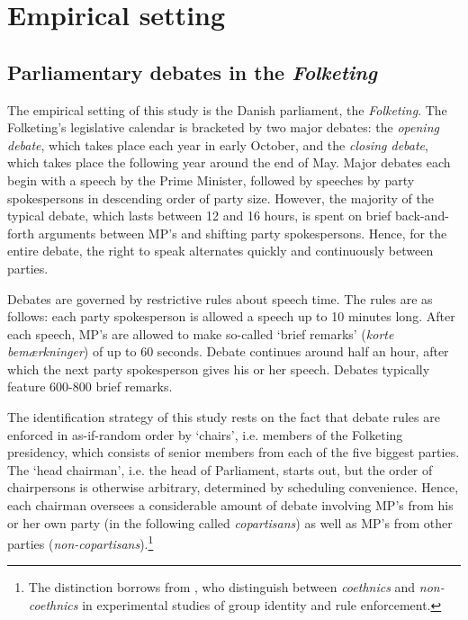 \documentclass[12pt,a4paper]{article}
\begin{document}
\section{Empirical setting}\label{emp}

\subsection{Parliamentary debates in the \textit{Folketing}}
The empirical setting of this study is the Danish parliament, the \textit{Folketing}. The Folketing's legislative calendar is bracketed by two major debates: the \textit{opening debate}, which takes place each year in early October, and the \textit{closing debate}, which takes place the following year around the end of May. Major debates each begin with a speech by the Prime Minister, followed by speeches by party spokespersons in descending order of party size. However, the majority of the typical debate, which lasts between 12 and 16 hours, is spent on brief back-and-forth arguments between MP's and shifting party spokespersons. Hence, for the entire debate, the right to speak alternates quickly and continuously between parties. 

Debates are governed by restrictive rules about speech time. The rules are as follows: each party spokesperson is allowed a speech up to 10 minutes long. After each speech, MP's are allowed to make so-called `brief remarks' (\textit{korte bemærkninger}) of up to 60 seconds. Debate continues around half an hour, after which the next party spokesperson gives his or her speech. Debates typically feature 600-800 brief remarks. 

The identification strategy of this study rests on the fact that debate rules are enforced in as-if-random order by `chairs', i.e. members of the Folketing presidency, which consists of senior members from each of the five biggest parties. The `head chairman', i.e. the head of Parliament, starts out, but the order of chairpersons is otherwise arbitrary, determined by scheduling convenience.  Hence, each chairman oversees a considerable amount of debate involving MP's from his or her own party (in the following called \textit{copartisans}) as well as MP's from other parties (\textit{non-copartisans}).\footnote{The distinction borrows from \cite{Habyarimana2007}, who distinguish between \textit{coethnics} and \textit{non-coethnics} in experimental studies of group identity and rule enforcement.} 
\end{document}
